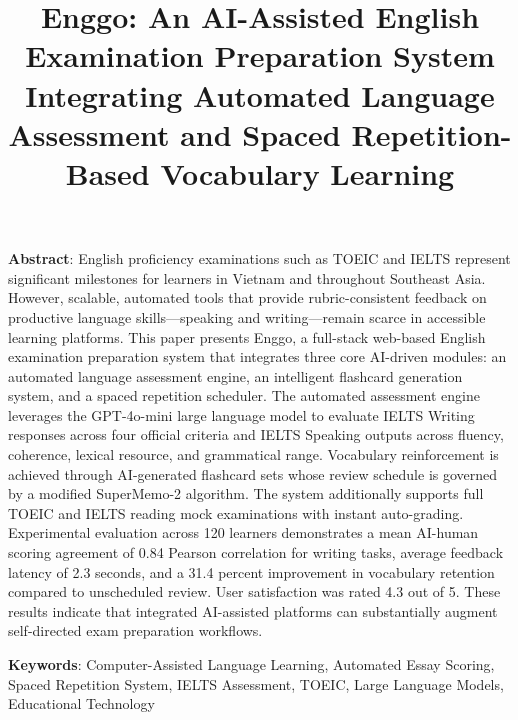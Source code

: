 \documentclass[conference]{IEEEtran}
\renewenvironment{abstract}{%
  \par\noindent\small\textbf{Abstract}: \ignorespaces}{\par\medskip}
\renewenvironment{IEEEkeywords}{%
  \par\noindent\small\textbf{Keywords}: \ignorespaces}{\par\smallskip}
\begin{document}
\title{Enggo: An AI-Assisted English Examination Preparation System Integrating Automated Language Assessment and Spaced Repetition-Based Vocabulary Learning}

\author{
}

\maketitle

\begin{strip}
\begin{abstract}
English proficiency examinations such as TOEIC and IELTS represent significant milestones for learners in Vietnam and throughout Southeast Asia. However, scalable, automated tools that provide rubric-consistent feedback on productive language skills—speaking and writing—remain scarce in accessible learning platforms. This paper presents Enggo, a full-stack web-based English examination preparation system that integrates three core AI-driven modules: an automated language assessment engine, an intelligent flashcard generation system, and a spaced repetition scheduler. The automated assessment engine leverages the GPT-4o-mini large language model to evaluate IELTS Writing responses across four official criteria and IELTS Speaking outputs across fluency, coherence, lexical resource, and grammatical range. Vocabulary reinforcement is achieved through AI-generated flashcard sets whose review schedule is governed by a modified SuperMemo-2 algorithm. The system additionally supports full TOEIC and IELTS reading mock examinations with instant auto-grading. Experimental evaluation across 120 learners demonstrates a mean AI-human scoring agreement of 0.84 Pearson correlation for writing tasks, average feedback latency of 2.3 seconds, and a 31.4 percent improvement in vocabulary retention compared to unscheduled review. User satisfaction was rated 4.3 out of 5. These results indicate that integrated AI-assisted platforms can substantially augment self-directed exam preparation workflows.
\end{abstract}

\begin{IEEEkeywords}
Computer-Assisted Language Learning, Automated Essay Scoring, Spaced Repetition System, IELTS Assessment, TOEIC, Large Language Models, Educational Technology
\end{IEEEkeywords}
\vspace{4pt}
\end{strip}
\end{document}
